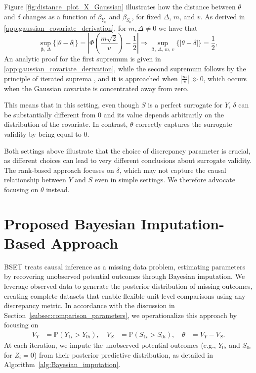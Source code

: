 \documentclass[referee,usenatbib]{biom}
\newcommand{\Prob}{\mathbb{P}}
\begin{document}
Figure \ref{fig:distance_plot_X_Gaussian} illustrates how the distance between \(\theta\) and \(\delta\) changes as a function of \(\beta_{Y_0}\) and \(\beta_{S_0}\), for fixed \(\Delta\), \(m\), and \(v\). As derived in \ref{app:gaussian_covariate_derivation}, for \(m, \Delta \neq 0\) we have that
\begin{equation*}
  \sup_{\boldsymbol{\beta},\, \Delta} \{ |\theta - \delta| \} = \left| \Phi\!\left(\frac{m\sqrt{2}}{v}\right) - \frac{1}{2} \right| \Rightarrow \sup_{\boldsymbol{\beta},\, \Delta,\, m,\, v} \{ |\theta - \delta| \} = \frac{1}{2},
\end{equation*}
An analytic proof for the first supremum is given in \ref{app:gaussian_covariate_derivation}, while the second supremum follows by the principle of iterated suprema \citep{rudin1976principles}, and it is approached when \(|\frac{m}{v}| \gg 0\), which occurs when the Gaussian covariate is concentrated away from zero.

This means that in this setting, even though \(S\) is a perfect surrogate for \(Y\), \(\delta\) can be substantially different from \(0\) and its value depends arbitrarily on the distribution of the covariate. In contrast, \(\theta\) correctly captures the surrogate validity by being equal to \(0\).

Both settings above illustrate that the choice of discrepancy parameter is crucial, as different choices can lead to very different conclusions about surrogate validity. The rank-based approach focuses on \(\delta\), which may not capture the causal relationship between \(Y\) and \(S\) even in simple settings. We therefore advocate focusing on \(\theta\) instead.

\section{Proposed Bayesian Imputation-Based Approach}\label{sec:bayesian_approach}

BSET treats causal inference as a missing data problem, estimating parameters by recovering unobserved potential outcomes through Bayesian imputation. We leverage observed data to generate the posterior distribution of missing outcomes, creating complete datasets that enable flexible unit-level comparisons using any discrepancy metric. In accordance with the discussion in Section~\ref{subsec:comparison_parameters}, we operationalize this approach by focusing on
\begin{equation}
  \label{eq:V_definitions}
  \begin{aligned}
    V_{Y} & = \Prob(Y_{1i} > Y_{0i}), \quad V_{S} & = \Prob(S_{1i} > S_{0i}), \quad \theta & = V_{Y} - V_{S}.
  \end{aligned}
\end{equation}
At each iteration, we impute the unobserved potential outcomes (e.g., \(Y_{0i}\) and \(S_{0i}\) for \(Z_{i} = 0\)) from their posterior predictive distribution, as detailed in Algorithm~\ref{alg:Bayesian_imputation}.
\end{document}
